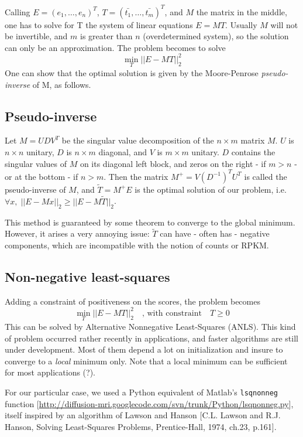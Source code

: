 \documentclass[a4paper,11pt]{article}
\begin{document}
Calling $E = (e_1, \ldots, e_n)^T$, $T = (\bar{t_{1}},\ldots,\bar{t_{m}})^T$, and $M$ the matrix in the middle, one has to solve for T the system of linear equations $E = MT$. Usually $M$ will not be invertible, and $m$ is greater than $n$ (overdetermined system), so the solution can only be an approximation. The problem becomes to solve
$$ \min_T ||E-MT||_2^2 $$
One can show that the optimal solution is given by the Moore-Penrose \emph{pseudo-inverse} of M, as follows.

\subsection{Pseudo-inverse}

Let $M = UDV^T$ be the singular value decomposition of the $n\times m$ matrix $M$. $U$ is $n\times n$ unitary, $D$ is $n\times m$ diagonal, and $V$ is $m\times m$ unitary. $D$ contains the singular values of $M$ on its diagonal left block, and zeros on the right - if $m>n$ - or at the bottom - if $n>m$.
Then the matrix $M^{+} = V(D^{-1})^T U^T$ is called the pseudo-inverse of $M$, and $\tilde{T} = M^{+}E$ is the optimal solution of our problem, i.e. $\forall x, \; ||E-Mx||_2 \ge ||E-M\tilde{T}||_2$.


This method is guaranteed by some theorem to converge to the global minimum. However, it arises a very annoying issue: $\tilde{T}$ can have - often has - negative components, which are incompatible with the notion of counts or RPKM.

\subsection{Non-negative least-squares}

Adding a constraint of positiveness on the scores, the problem becomes
$$ \min_T ||E-MT||_2^2 \quad \text{, with constraint} \quad T \geq 0 $$
This can be solved by Alternative Nonnegative Least-Squares (ANLS). This kind of problem occurred rather recently in applications, and faster algorithms are still under development. Most of them depend a lot on initialization and insure to converge to a \emph{local} minimum only. Note that a local minimum can be sufficient for most applications (?).

For our particular case, we used a Python equivalent of Matlab's \texttt{lsqnonneg} function [\url{http://diffusion-mri.googlecode.com/svn/trunk/Python/lsqnonneg.py}], itself inspired by an algorithm of Lawson and Hanson [C.L. Lawson and R.J. Hanson, Solving Least-Squares Problems, Prentice-Hall, 1974, ch.23, p.161].
\end{document}
